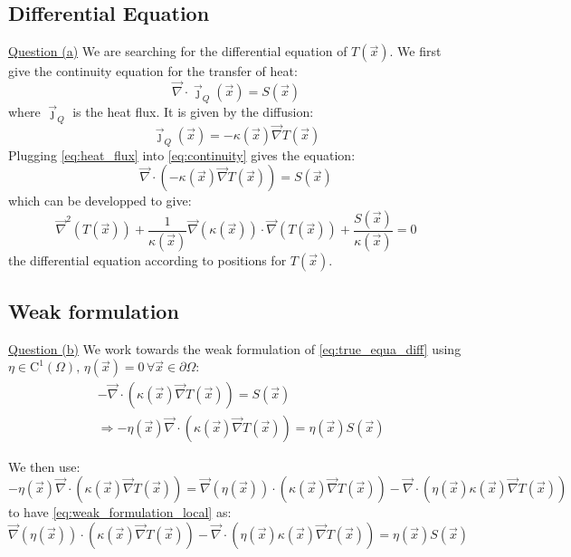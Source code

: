 \subsection{Differential Equation}
\underline{Question (a)}
We are searching for the differential equation of $T(\vec{x})$. We first give the continuity equation for the transfer of heat:
\begin{equation}
    \vec{\nabla} \cdot \vec{\jmath}_Q(\vec{x}) = S(\vec{x})
    \label{eq:continuity}
\end{equation}
where $\vec{\jmath}_Q$ is the heat flux. It is given by the diffusion:
\begin{equation}
    \vec{\jmath}_Q(\vec{x}) = -\kappa (\vec{x}) \vec{\nabla}T(\vec{x})
    \label{eq:heat_flux}
\end{equation}
Plugging \autoref{eq:heat_flux} into \autoref{eq:continuity} gives the equation:
\begin{equation}
    \vec{\nabla} \cdot (-\kappa(\vec{x})\vec{\nabla}T(\vec{x})) = S(\vec{x})
    \label{eq:true_equa_diff}
\end{equation}
which can be developped to give:
\begin{equation}
    \vec{\nabla}^2(T(\vec{x})) + \frac{1}{\kappa(\vec{x})} \vec{\nabla}(\kappa(\vec{x})) \cdot \vec{\nabla}(T(\vec{x})) + \frac{S(\vec{x})}{\kappa(\vec{x})} = 0
    \label{eq:equa_diff_T}
\end{equation}
the differential equation according to positions for $T(\vec{x})$.

\subsection{Weak formulation}
\underline{Question (b)}
We work towards the weak formulation of \autoref{eq:true_equa_diff} using $\eta \in \mathrm{C}^1(\Omega), \, \eta(\vec{x}) = 0 \,\forall \vec{x} \in \partial\Omega$:
\begin{equation}
    \begin{aligned}
        & -\vec{\nabla} \cdot (\kappa(\vec{x})\vec{\nabla}T(\vec{x})) = S(\vec{x}) \\
        & \Rightarrow -\eta(\vec{x}) \vec{\nabla} \cdot (\kappa(\vec{x})\vec{\nabla}T(\vec{x})) = \eta(\vec{x}) S(\vec{x})
    \end{aligned}
    \label{eq:weak_formulation_local}
\end{equation}

We then use:
\begin{equation}
    -\eta(\vec{x})\vec{\nabla}\cdot(\kappa(\vec{x})\vec{\nabla}T(\vec{x})) = \vec{\nabla}(\eta(\vec{x}))\cdot(\kappa(\vec{x})\vec{\nabla}T(\vec{x})) - \vec{\nabla}\cdot(\eta(\vec{x})\kappa(\vec{x})\vec{\nabla}T(\vec{x}))
\end{equation}
to have \autoref{eq:weak_formulation_local} as:
\begin{equation}
    \vec{\nabla}(\eta(\vec{x}))\cdot(\kappa(\vec{x})\vec{\nabla}T(\vec{x})) - \vec{\nabla}\cdot(\eta(\vec{x})\kappa(\vec{x})\vec{\nabla}T(\vec{x})) = \eta(\vec{x})S(\vec{x})
\end{equation}


